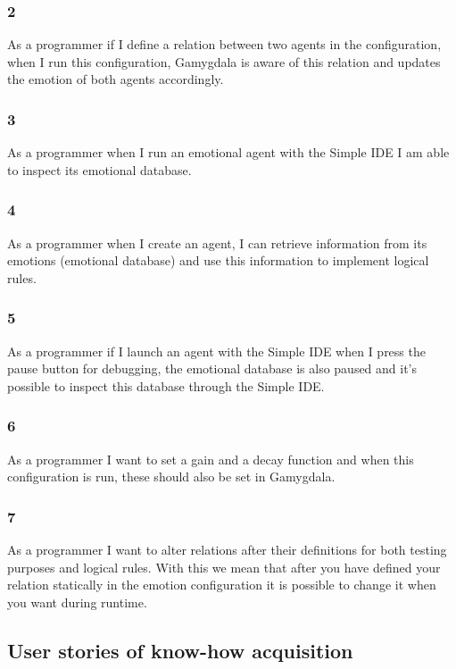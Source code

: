 \documentclass[]{article}
\begin{document}
\subsubsection*{2}
As a programmer if I define a relation between two agents in the configuration, when I run this configuration, Gamygdala is aware of this relation and updates the emotion of both agents accordingly.

\subsubsection*{3}As a programmer when I run an emotional agent with the Simple IDE\cite{SimpleIDE} I am able to inspect its emotional database.

\subsubsection*{4}As a programmer when I create an agent, I can retrieve information from its emotions (emotional database) and use this information to implement logical rules.

\subsubsection*{5} As a programmer if I launch an agent with the Simple IDE \cite{SimpleIDE} when I press the pause button for debugging, the emotional database is also paused and it's possible to inspect this database through the Simple IDE\cite{SimpleIDE}.

\subsubsection*{6} As a programmer I want to set a gain and a decay function and when this configuration is run, these should also be set in Gamygdala.

\subsubsection*{7} As a programmer I want to alter relations after their definitions for both testing purposes and logical rules. With this we mean that after you have defined your relation statically in the emotion configuration it is possible to change it when you want during runtime.



\subsection{User stories of know-how acquisition}
\end{document}
